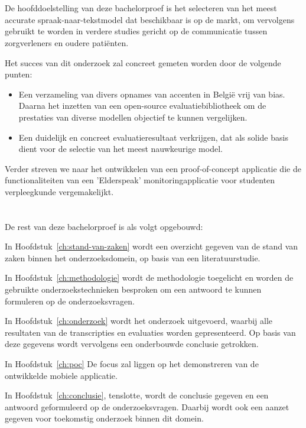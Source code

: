\section{}%
\label{sec:onderzoeksdoelstelling}

De hoofddoelstelling van deze bachelorproef is het selecteren van het meest accurate spraak-naar-tekstmodel dat beschikbaar is op de markt, om vervolgens gebruikt te worden in verdere studies gericht op de communicatie tussen zorgverleners en oudere patiënten. 



Het succes van dit onderzoek zal concreet gemeten worden door de volgende punten: 

\begin{itemize}
    \item Een verzameling van divers opnames van accenten in België vrij van bias. Daarna het inzetten van een open-source evaluatiebibliotheek om de prestaties van diverse modellen objectief te kunnen vergelijken. 
    \item Een duidelijk en concreet evaluatieresultaat verkrijgen, dat als solide basis dient voor de selectie van het meest nauwkeurige model.
    

\end{itemize}

Verder streven we naar het ontwikkelen van een proof-of-concept applicatie die de functionaliteiten van een 'Elderspeak' monitoringapplicatie voor studenten verpleegkunde vergemakelijkt.

\section{}%
\label{sec:opzet-bachelorproef}


De rest van deze bachelorproef is als volgt opgebouwd:

In Hoofdstuk~\ref{ch:stand-van-zaken} wordt een overzicht gegeven van de stand van zaken binnen het onderzoeksdomein, op basis van een literatuurstudie.

In Hoofdstuk~\ref{ch:methodologie} wordt de methodologie toegelicht en worden de gebruikte onderzoekstechnieken besproken om een antwoord te kunnen formuleren op de onderzoeksvragen.

In Hoofdstuk~\ref{ch:onderzoek} wordt het onderzoek uitgevoerd, waarbij alle resultaten van de transcripties en evaluaties worden gepresenteerd. Op basis van deze gegevens wordt vervolgens een onderbouwde conclusie getrokken.

In Hoofdstuk~\ref{ch:poc} De focus zal liggen op het demonstreren van de ontwikkelde mobiele applicatie.

In Hoofdstuk~\ref{ch:conclusie}, tenslotte, wordt de conclusie gegeven en een antwoord geformuleerd op de onderzoeksvragen. Daarbij wordt ook een aanzet gegeven voor toekomstig onderzoek binnen dit domein.